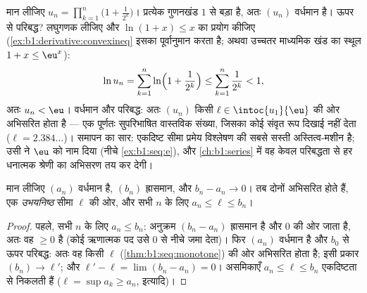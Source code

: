 \begin{example}[अस्तित्व-मशीन के रूप में एकदिष्ट प्रमेय]\label{ex:b1:seq:existencemachine}
मान लीजिए $u_n = \prod_{k=1}^{n} \bigl(1 + \frac{1}{2^k}\bigr)$। प्रत्येक
गुणनखंड $1$ से बड़ा है, अतः $(u_n)$ वर्धमान है। ऊपर से परिबद्ध? लघुगणक लीजिए
और $\ln(1 + x) \leq x$ का प्रयोग कीजिए (\cref{ex:b1:derivative:convexineq}
इसका पूर्वानुमान करता है; अथवा उच्चतर माध्यमिक खंड का स्थूल $1 + x \leq
\eu^x$):
\[
\ln u_n = \sum_{k=1}^{n} \ln\Bigl(1 + \frac{1}{2^k}\Bigr)
\leq \sum_{k=1}^{n} \frac{1}{2^k} < 1 ,
\]
अतः $u_n < \eu$। वर्धमान और परिबद्ध: अतः $(u_n)$ किसी $\ell \in
\intoc{u_1}{\eu}$ की ओर अभिसरित होता है --- एक पूर्णतः सुपरिभाषित वास्तविक
संख्या, जिसका कोई संवृत रूप दिखाई नहीं देता ($\ell = 2.384\dots$)। समापन का
सार: एकदिष्ट सीमा प्रमेय विश्लेषण की सबसे सस्ती अस्तित्व-मशीन है; उसी ने
$\eu$ को नाम दिया (नीचे \cref{ex:b1:seq:e}), और \cref{ch:b1:series} में वह
केवल परिबद्धता से हर धनात्मक श्रेणी का अभिसरण तय कर देगी।
\end{example}

\begin{theorem}[संलग्न अनुक्रम]\label{thm:b1:seq:adjacent}
मान लीजिए $(a_n)$ वर्धमान है, $(b_n)$ ह्रासमान, और $b_n - a_n \to 0$। तब
दोनों अभिसरित होते हैं, एक \emph{उभयनिष्ठ} सीमा $\ell$ की ओर, और सभी $n$ के
लिए $a_n \leq \ell \leq b_n$।
\end{theorem}

\begin{proof}
पहले, सभी $n$ के लिए $a_n \leq b_n$: अनुक्रम $(b_n - a_n)$ ह्रासमान है और
$0$ की ओर जाता है, अतः वह $\geq 0$ है (कोई ऋणात्मक पद उसे $0$ से नीचे जमा
देता)। फिर $(a_n)$ वर्धमान है और $b_0$ से ऊपर परिबद्ध: अतः वह किसी $\ell$
(\cref{thm:b1:seq:monotone}) की ओर अभिसरित होता है; इसी प्रकार $(b_n) \to
\ell'$; और $\ell' - \ell = \lim (b_n - a_n) = 0$। असमिकाएँ $a_n \leq \ell
\leq b_n$ एकदिष्टता से निकलती हैं ($\ell = \sup a_k \geq a_n$, इत्यादि)।
\end{proof}

